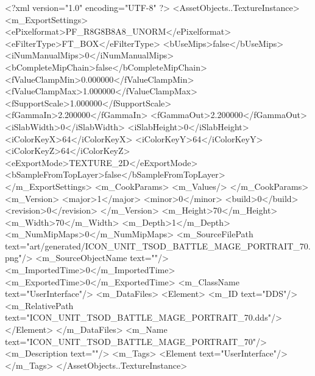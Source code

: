 <?xml version="1.0" encoding="UTF-8" ?>
<AssetObjects..TextureInstance>
	<m_ExportSettings>
		<ePixelformat>PF_R8G8B8A8_UNORM</ePixelformat>
		<eFilterType>FT_BOX</eFilterType>
		<bUseMips>false</bUseMips>
		<iNumManualMips>0</iNumManualMips>
		<bCompleteMipChain>false</bCompleteMipChain>
		<fValueClampMin>0.000000</fValueClampMin>
		<fValueClampMax>1.000000</fValueClampMax>
		<fSupportScale>1.000000</fSupportScale>
		<fGammaIn>2.200000</fGammaIn>
		<fGammaOut>2.200000</fGammaOut>
		<iSlabWidth>0</iSlabWidth>
		<iSlabHeight>0</iSlabHeight>
		<iColorKeyX>64</iColorKeyX>
		<iColorKeyY>64</iColorKeyY>
		<iColorKeyZ>64</iColorKeyZ>
		<eExportMode>TEXTURE_2D</eExportMode>
		<bSampleFromTopLayer>false</bSampleFromTopLayer>
	</m_ExportSettings>
	<m_CookParams>
		<m_Values/>
	</m_CookParams>
	<m_Version>
		<major>1</major>
		<minor>0</minor>
		<build>0</build>
		<revision>0</revision>
	</m_Version>
	<m_Height>70</m_Height>
	<m_Width>70</m_Width>
	<m_Depth>1</m_Depth>
	<m_NumMipMaps>0</m_NumMipMaps>
	<m_SourceFilePath text="art/generated/ICON_UNIT_TSOD_BATTLE_MAGE_PORTRAIT_70.png"/>
	<m_SourceObjectName text=""/>
	<m_ImportedTime>0</m_ImportedTime>
	<m_ExportedTime>0</m_ExportedTime>
	<m_ClassName text="UserInterface"/>
	<m_DataFiles>
		<Element>
			<m_ID text="DDS"/>
			<m_RelativePath text="ICON_UNIT_TSOD_BATTLE_MAGE_PORTRAIT_70.dds"/>
		</Element>
	</m_DataFiles>
	<m_Name text="ICON_UNIT_TSOD_BATTLE_MAGE_PORTRAIT_70"/>
	<m_Description text=""/>
	<m_Tags>
		<Element text="UserInterface"/>
	</m_Tags>
</AssetObjects..TextureInstance>
